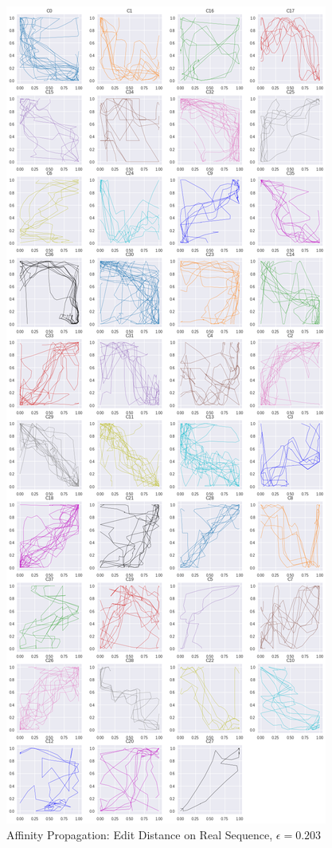 \begin{figure}[h]
  \centering
  \includegraphics[width=\linewidth,height=\textheight,keepaspectratio]{figs/clusters/CLU_AP_ALL[EDR;e=.203].png}
  \caption{Affinity Propagation: Edit Distance on Real Sequence, $\epsilon=0.203$}
\end{figure}

